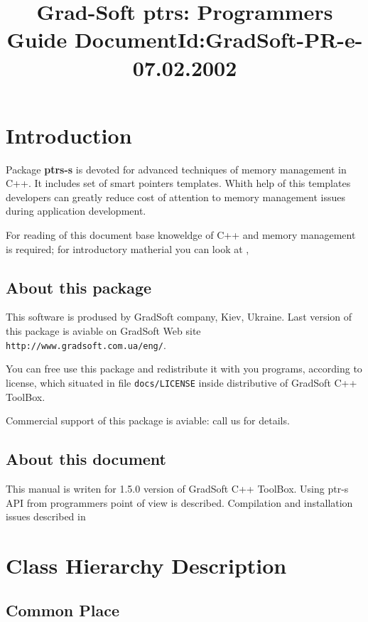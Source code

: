 \documentclass[10pt]{article}
\title{ Grad-Soft ptrs: Programmers Guide  
       \newline
       \small{DocumentId:GradSoft-PR-e-07.02.2002}
      }
\begin{document}
\maketitle{}

\tableofcontents

\section{ Introduction }

 Package {\bf ptrs-s } is devoted for advanced techniques of memory
 management in C++. 
 It includes set of smart pointers templates. Whith help of this
 templates developers can greatly reduce cost of attention to
  memory management issues
  during application development.

 For reading of this document base knoweldge of C++  and memory management
 is required; for introductory matherial you can look
 at 
 \cite{CPP-std}, \cite{Harvey}

\subsection{ About this package }

 This software is prodused by GradSoft company, Kiev, Ukraine.
Last version of this package is aviable on GradSoft Web site
\verb|http://www.gradsoft.com.ua/eng/|.

 You can free use this package and redistribute it with you programs,
according to license, which situated in file \verb|docs/LICENSE| inside
distributive of GradSoft C++ ToolBox.

 Commercial support of this package is aviable: call us for details.

\subsection{ About this document }

 This manual is writen for 1.5.0 version of GradSoft C++ ToolBox.
 Using ptr-s API from programmers point of view is described.
 Compilation and installation issues described in \cite{AD}

\section{ Class Hierarchy Description }

\subsection{ Common Place }
\end{document}

